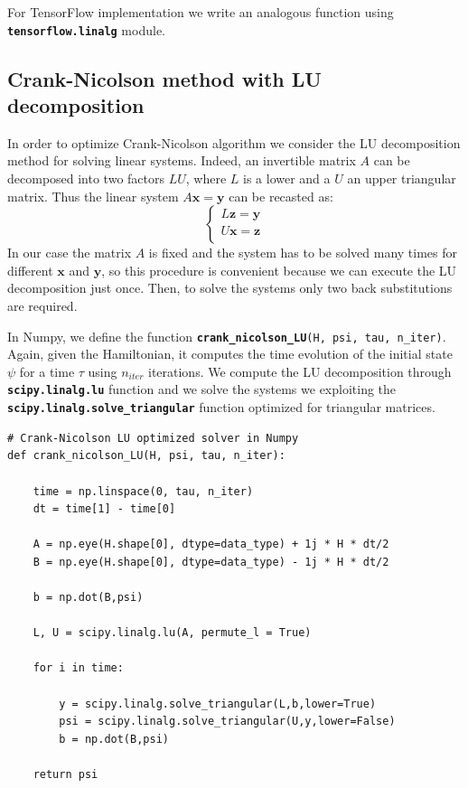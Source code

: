 \documentclass[rmp,10pt,onecolumn,fleqn,notitlepage]{revtex4-1}
\begin{document}
For TensorFlow implementation we write an analogous function using {\bfseries\texttt{tensorflow.linalg}} module.
 
\subsection{Crank-Nicolson method with LU decomposition} 
\label{subsec:crank-nicolson-lu}
In order to optimize Crank-Nicolson algorithm we consider the LU decomposition method for solving linear systems. 
Indeed, an invertible matrix $A$ can be decomposed into two factors $LU$, where $L$ is a lower and a $U$ an upper triangular matrix. Thus the linear system $A\boldsymbol{x} = \boldsymbol{y}$ can be recasted as: 
\begin{equation}
    \begin{cases}
        L\boldsymbol{z} = \boldsymbol{y} \\
        U\boldsymbol{x} = \boldsymbol{z} \\
    \end{cases}
\end{equation}
In our case the matrix $A$ is fixed and the system has to be solved many times for different $\boldsymbol{x}$ and $\boldsymbol{y}$, so this procedure is convenient because we can execute the LU decomposition just once. Then, to solve the systems only two back substitutions are required.

In Numpy, we define the function {\bfseries \texttt{crank\_nicolson\_LU}}\texttt{(H, psi, tau, n\_iter)}. Again, given the Hamiltonian, it computes the time evolution of the initial state $\psi$ for a time $\tau$ using $n_{iter}$ iterations.
We compute the LU decomposition through {\bfseries\texttt{scipy.linalg.lu}} function and we solve the systems we exploiting the {\bfseries\texttt{scipy.linalg.solve\_triangular}} function optimized for triangular matrices. 

\begin{lstlisting}[style=myPython]
# Crank-Nicolson LU optimized solver in Numpy
def crank_nicolson_LU(H, psi, tau, n_iter):
    
    time = np.linspace(0, tau, n_iter)
    dt = time[1] - time[0]
    
    A = np.eye(H.shape[0], dtype=data_type) + 1j * H * dt/2
    B = np.eye(H.shape[0], dtype=data_type) - 1j * H * dt/2

    b = np.dot(B,psi) 
    
    L, U = scipy.linalg.lu(A, permute_l = True)

    for i in time:
        
        y = scipy.linalg.solve_triangular(L,b,lower=True)
        psi = scipy.linalg.solve_triangular(U,y,lower=False)        
        b = np.dot(B,psi) 
    
    return psi
\end{lstlisting}
\end{document}
